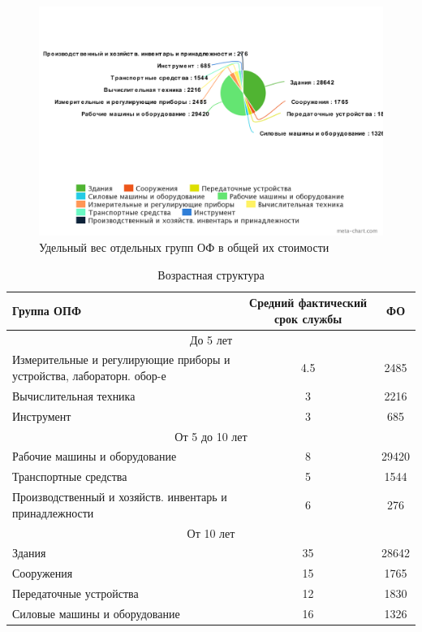 \begin{figure}[H]
	\centering
	\caption{Удельный вес отдельных групп ОФ в общей их стоимости}
	\includegraphics[width=\textwidth]{images/udel_ves_grup.png}
\end{figure}


\begin{table}[H]
	\caption{Возрастная структура}
	\centering
	\begin{tabular}{|m{7cm}|c|c|}
		\hline
		Группа ОПФ & Средний фактический срок службы & ФО\\ \hline
		\multicolumn{3}{|c|}{До 5 лет} \\ \hline
		Измерительные и регулирующие приборы и устройства, лабораторн. обор-е & 4.5 & 2485 \\ \hline
		Вычислительная техника & 3 & 2216 \\ \hline
		Инструмент & 3 & 685\\ \hline
		\multicolumn{3}{|c|}{От 5 до 10 лет} \\ \hline
		Рабочие  машины и оборудование & 8 & 29420 \\ \hline
		Транспортные средства & 5 & 1544\\ \hline
		Производственный и хозяйств. инвентарь и принадлежности & 6 & 276\\ \hline
		\multicolumn{3}{|c|}{От 10 лет} \\ \hline
		Здания & 35 & 28642 \\ \hline
		Сооружения & 15 & 1765\\ \hline
		Передаточные устройства & 12 & 1830\\ \hline
		Силовые машины и оборудование & 16 & 1326 \\ \hline
		
	\end{tabular}
\end{table}

